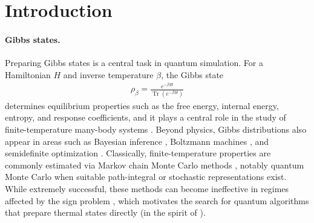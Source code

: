 \documentclass[showpacs,amsmath,amssymb,twocolumn,prx,superscriptaddress,10pt,aps,nofootinbib]{revtex4-2}
\begin{document}
\maketitle



\section{Introduction}

\paragraph{Gibbs states.} Preparing Gibbs states is a central task in quantum simulation. For a Hamiltonian $H$ and inverse temperature $\beta$, the Gibbs state
\begin{align}\label{eq:gibbs-state}
    \rho_\beta = \frac{e^{-\beta H}}{\operatorname{Tr}(e^{-\beta H})}
\end{align}
determines equilibrium properties such as the free energy, internal energy, entropy, and response coefficients, and it plays a central role in the study of finite-temperature many-body systems \cite{Binder1987,landau2021guide,takahashi1996thermo,maldacena2003eternal,zhu2020generation}. Beyond physics, Gibbs distributions also appear in areas such as Bayesian inference \cite{gelfand2000gibbs}, Boltzmann machines \cite{ackley1985learning, amin2018quantum}, and semidefinite optimization \cite{arora2012multiplicative, brandao2017quantum, van2017quantum}. Classically, finite-temperature properties are commonly estimated via Markov chain Monte Carlo methods \cite{metropolis1953equation, robert1999monte, levin2017markov}, notably quantum Monte Carlo \cite{foulkes2001quantum} when suitable path-integral or stochastic representations exist.
While extremely successful, these methods can become ineffective in regimes affected by the sign problem \cite{Henelius2000,pan2022sign}, which motivates the search for quantum algorithms that prepare thermal states directly (in the spirit of \cite{feynman1982simulating}).
\end{document}
